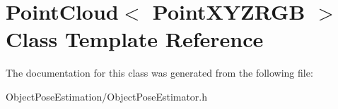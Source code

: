 \hypertarget{class_point_cloud}{\section{Point\-Cloud$<$ Point\-X\-Y\-Z\-R\-G\-B $>$ Class Template Reference}
\label{class_point_cloud}
}


The documentation for this class was generated from the following file\-:\begin{DoxyCompactItemize}
\item 
Object\-Pose\-Estimation/Object\-Pose\-Estimator.\-h\end{DoxyCompactItemize}
